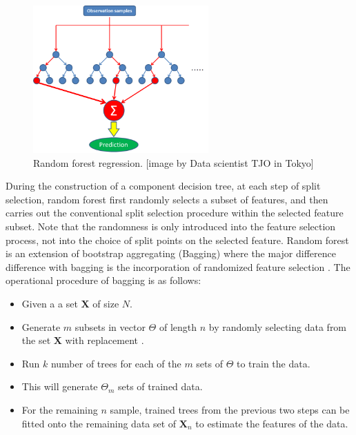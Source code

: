  \begin{figure}[H]
  \centering
    \includegraphics[width=0.6\textwidth]{images/RandomForestTree.png}
    \caption{Random forest regression. [image by Data scientist TJO in Tokyo]}
  \label{random tree}
\end{figure}

During the construction of a component decision tree, at each step
of split selection, random forest first randomly selects a subset of features, and then carries out the conventional split selection procedure within the selected
feature subset. Note that the randomness is only introduced into
the feature selection process, not into the choice of split points on the selected feature. Random forest is an extension of bootstrap aggregating (Bagging) where the major difference difference with bagging is the incorporation of randomized feature selection \citep{zhou2012ensemble}. The operational procedure of bagging is as follows: 

\begin{itemize}
\item Given a a set $\textbf{X}$ of size $\textit{N}$.
\item Generate $\textit{m}$ subsets in vector $\Theta$  of length $\textit{n}$ by randomly selecting data from the set $\textbf{X}$ with replacement \citep{breiman2001random}. 
\item Run $\textit{k}$ number of trees for each of the $\textit{m}$ sets of $\Theta$ to train the data.
\item This will generate $\Theta_{\textit{m}}$ sets of trained data.
\item For the remaining $\textit{n}$ sample, trained trees from the previous two steps can be fitted onto the remaining
data set of $\textbf{X}_{\textit{n}}$ to estimate the features of the data.
\end{itemize}

